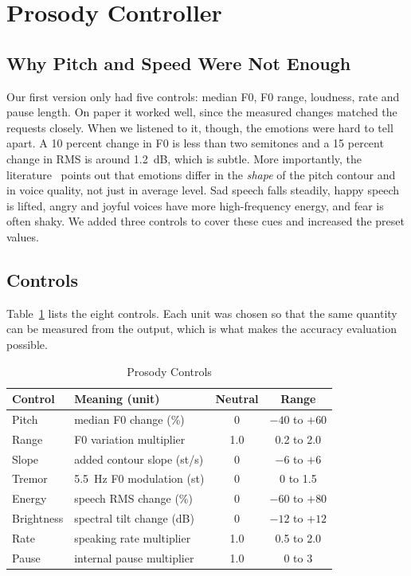 \documentclass[conference]{IEEEtran}
\begin{document}
\section{Prosody Controller}\label{sec:prosody}

\subsection{Why Pitch and Speed Were Not Enough}
Our first version only had five controls: median F0, F0 range, loudness, rate and pause length.
On paper it worked well, since the measured changes matched the requests closely. When we
listened to it, though, the emotions were hard to tell apart. A 10 percent change in F0 is less
than two semitones and a 15 percent change in RMS is around 1.2~dB, which is subtle. More
importantly, the literature~\cite{b11,b13,b14} points out that emotions differ in the \emph{shape}
of the pitch contour and in voice quality, not just in average level. Sad speech falls steadily,
happy speech is lifted, angry and joyful voices have more high-frequency energy, and fear is
often shaky. We added three controls to cover these cues and increased the preset values.

\subsection{Controls}
Table~\ref{tab:controls} lists the eight controls. Each unit was chosen so that the same quantity
can be measured from the output, which is what makes the accuracy evaluation possible.

\begin{table}[htbp]
\caption{Prosody Controls}
\begin{center}
\begin{tabular}{|l|l|c|c|}
\hline
\textbf{Control} & \textbf{Meaning (unit)} & \textbf{Neutral} & \textbf{Range} \\
\hline
Pitch & median F0 change (\%) & 0 & $-40$ to $+60$ \\
Range & F0 variation multiplier & 1.0 & 0.2 to 2.0 \\
Slope & added contour slope (st/s) & 0 & $-6$ to $+6$ \\
Tremor & 5.5~Hz F0 modulation (st) & 0 & 0 to 1.5 \\
Energy & speech RMS change (\%) & 0 & $-60$ to $+80$ \\
Brightness & spectral tilt change (dB) & 0 & $-12$ to $+12$ \\
Rate & speaking rate multiplier & 1.0 & 0.5 to 2.0 \\
Pause & internal pause multiplier & 1.0 & 0 to 3 \\
\hline
\end{tabular}
\label{tab:controls}
\end{center}
\end{table}
\end{document}
